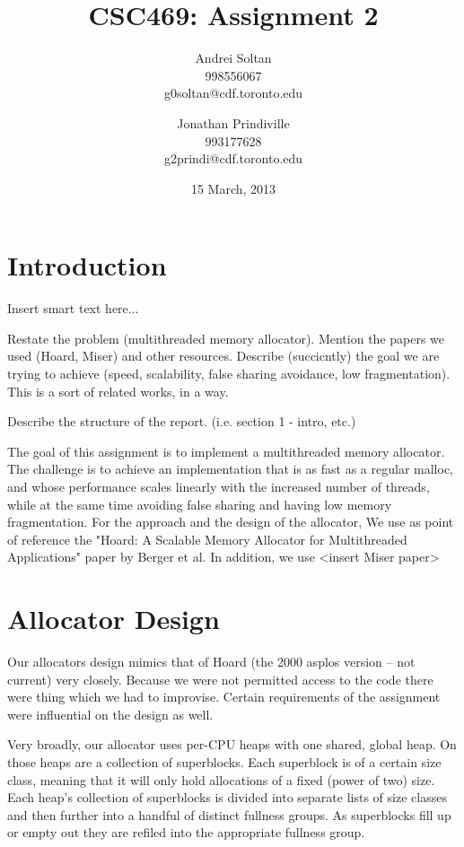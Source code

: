 \documentclass{article}
\author{Andrei Soltan\\998556067\\g0soltan@cdf.toronto.edu
\and Jonathan Prindiville\\993177628\\g2prindi@cdf.toronto.edu}
\title{CSC469: Assignment 2}
\date{15 March, 2013}
\begin{document}
\maketitle

\tableofcontents

\newpage
\section{Introduction}

Insert smart text here...

Restate the problem (multithreaded memory allocator). Mention the papers we
used (Hoard, Miser) and other resources. Describe (succicntly) the goal we are 
trying to achieve (speed, scalability, false sharing avoidance, low fragmentation). 
This is a sort of related works, in a way.

Describe the structure of the report. (i.e. section 1 - intro, etc.)

The goal of this assignment is to implement a multithreaded memory allocator.
The challenge is to achieve an implementation that is as fast as a regular 
malloc, and whose performance scales linearly with the increased number of
threads, while at the same time avoiding false sharing and having low 
memory fragmentation. For the approach and the design of the allocator, 
We use as point of reference the "Hoard: A Scalable Memory Allocator for 
Multithreaded Applications" paper by Berger et al. In addition, we use 
<insert Miser paper>

\newpage
\section{Allocator Design}

Our allocators design mimics that of Hoard (the 2000 asplos version -- not
current) very closely. Because we were not permitted access to the code there
were thing which we had to improvise. Certain requirements of the assignment
were influential on the design as well.

Very broadly, our allocator uses per-CPU heaps with one shared, global heap.
On those heaps are a collection of superblocks. Each superblock is of a
certain size class, meaning that it will only hold allocations of a fixed
(power of two) size. Each heap's collection of superblocks is divided into
separate lists of size classes and then further into a handful of distinct
fullness groups. As superblocks fill up or empty out they are refiled into
the appropriate fullness group.
\end{document}
